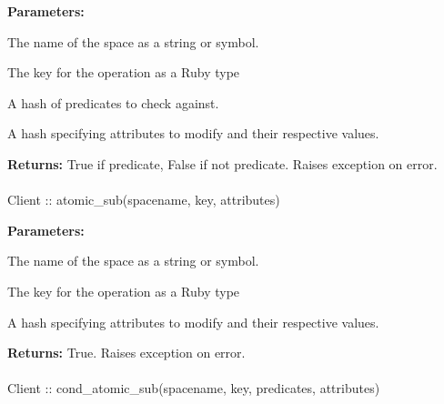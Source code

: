 \noindent\textbf{Parameters:}
\begin{description}[labelindent=\widthof{{\code{predicates}}},leftmargin=*,noitemsep,nolistsep,align=right]
\item[\code{spacename}] The name of the space as a string or symbol.
\item[\code{key}] The key for the operation as a Ruby type
\item[\code{predicates}] A hash of predicates to check against.
\item[\code{attributes}] A hash specifying attributes to modify and their respective values.
\end{description}

\noindent\textbf{Returns:}
True if predicate, False if not predicate.  Raises exception on error.

\paragraph{}
\label{api:ruby:atomic_sub}
\begin{ccode}
Client :: atomic_sub(spacename, key, attributes)
\end{ccode}
\funcdesc 

\noindent\textbf{Parameters:}
\begin{description}[labelindent=\widthof{{\code{attributes}}},leftmargin=*,noitemsep,nolistsep,align=right]
\item[\code{spacename}] The name of the space as a string or symbol.
\item[\code{key}] The key for the operation as a Ruby type
\item[\code{attributes}] A hash specifying attributes to modify and their respective values.
\end{description}

\noindent\textbf{Returns:}
True.  Raises exception on error.

\paragraph{}
\label{api:ruby:cond_atomic_sub}
\begin{ccode}
Client :: cond_atomic_sub(spacename, key, predicates, attributes)
\end{ccode}
\funcdesc 

